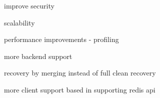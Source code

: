 improve security

scalability

performance improvements - profiling

more backend support

recovery by merging instead of full clean recovery

more client support based in supporting redis api


